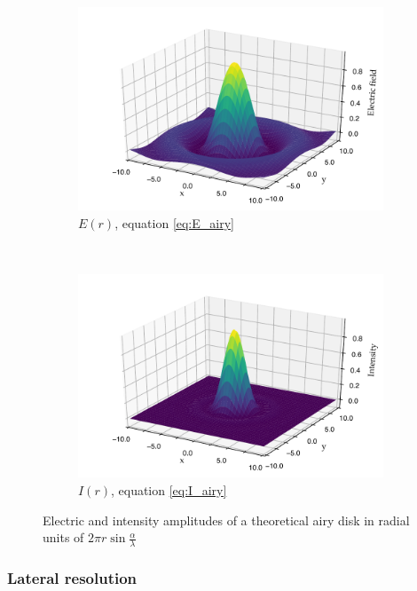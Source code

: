 \begin{figure}
    \centering
    \begin{subfigure}[b]{\textwidth}
        \includegraphics{+airy_E_fill}
        \caption{$E(r)$, equation \eqref{eq:E_airy}}
        \label{fig:airy_E_fill}
    \end{subfigure}
    ~
    \begin{subfigure}[b]{\textwidth}
        \includegraphics{+airy_I_fill}
        \caption{$I(r)$, equation \eqref{eq:I_airy}}
        \label{fig:airy_I_fill}
    \end{subfigure}
    \caption{Electric and intensity amplitudes of a theoretical airy disk in radial units of $2\pi r \sin \frac{\alpha}{\lambda}$}
    \label{fig:airy_disk}
\end{figure}

\subsubsection{Lateral resolution}

